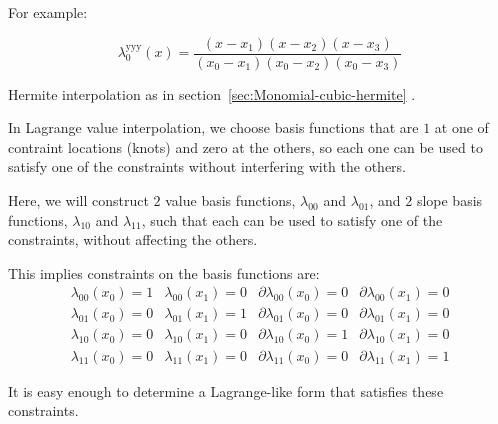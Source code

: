  
\label{sec:lagrange-yyyy}

For example:

\begin{equation}
\lambda^{\text{yyy}}_0(x) = 
\frac {(x - x_1) (x - x_2) (x - x_3)} 
{(x_0 - x_1) (x_0 - x_2) (x_0 - x_3)}
\end{equation}

\label{sec:Lagrange-cubic-hermite}

Hermite interpolation as in section~\ref{sec:Monomial-cubic-hermite}
\cite{wiki:Cubic-hermite-spline}.

In Lagrange value interpolation, we choose basis
functions that are $1$ at one of contraint locations (knots)
and zero at the others, so each one can be used to satisfy
one of the constraints without interfering with the others.

Here, we will construct $2$ value basis functions,
$\lambda_{00}$ and
$\lambda_{01}$,
and $2$ slope basis functions,
$\lambda_{10}$ and
$\lambda_{11}$, 
such that
each can be used to satisfy one of the constraints,
without affecting the others.

This implies constraints on the basis functions are:
\begin{equation}
\begin{array}{llll}
\lambda_{00}(x_0) = 1 & 
\lambda_{00}(x_1) = 0 &
\partial\lambda_{00}(x_0) = 0 &
\partial\lambda_{00}(x_1) = 0 \\
\lambda_{01}(x_0) = 0 &
\lambda_{01}(x_1) = 1 &
\partial\lambda_{01}(x_0) = 0 &
\partial\lambda_{01}(x_1) = 0  \\
\lambda_{10}(x_0) = 0 & 
\lambda_{10}(x_1) = 0 &
\partial\lambda_{10}(x_0) = 1 &
\partial\lambda_{10}(x_1) = 0 \\
\lambda_{11}(x_0) = 0 & 
\lambda_{11}(x_1) = 0 &
\partial\lambda_{11}(x_0) = 0 &
\partial\lambda_{11}(x_1) = 1  
\end{array}
\end{equation}

It is easy enough to determine a Lagrange-like form
that satisfies these constraints.

